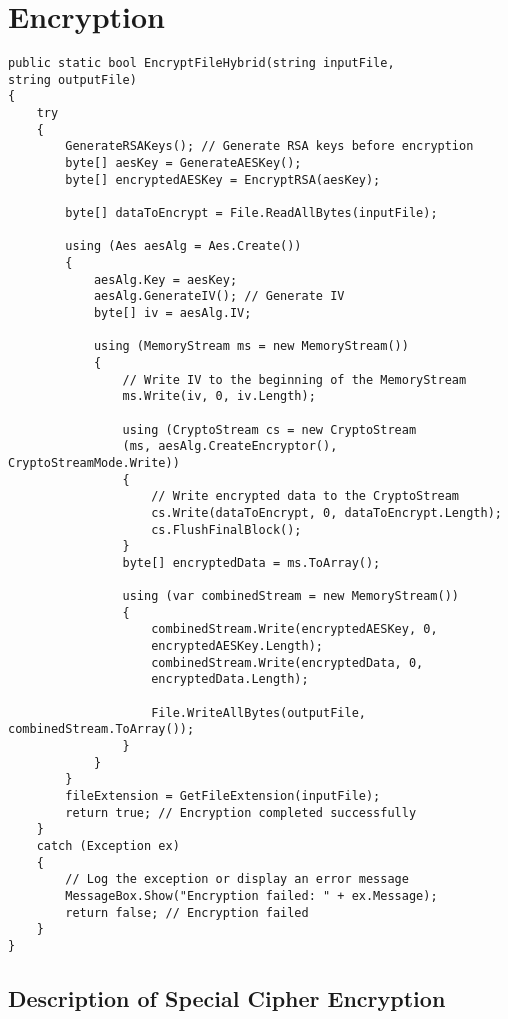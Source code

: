 \documentclass[a4paper,oneside,11pt]{book}
\begin{document}
\section{Encryption}
\begin{lstlisting}[language=Csh, caption={Code for Special Cipher Encryption}]
public static bool EncryptFileHybrid(string inputFile, 
string outputFile)
{
    try
    {
        GenerateRSAKeys(); // Generate RSA keys before encryption
        byte[] aesKey = GenerateAESKey();
        byte[] encryptedAESKey = EncryptRSA(aesKey);
    
        byte[] dataToEncrypt = File.ReadAllBytes(inputFile);
    
        using (Aes aesAlg = Aes.Create())
        {
            aesAlg.Key = aesKey;
            aesAlg.GenerateIV(); // Generate IV
            byte[] iv = aesAlg.IV;
    
            using (MemoryStream ms = new MemoryStream())
            {
                // Write IV to the beginning of the MemoryStream
                ms.Write(iv, 0, iv.Length);
    
                using (CryptoStream cs = new CryptoStream
                (ms, aesAlg.CreateEncryptor(), CryptoStreamMode.Write))
                {
                    // Write encrypted data to the CryptoStream
                    cs.Write(dataToEncrypt, 0, dataToEncrypt.Length);
                    cs.FlushFinalBlock();
                }
                byte[] encryptedData = ms.ToArray();
    
                using (var combinedStream = new MemoryStream())
                {
                    combinedStream.Write(encryptedAESKey, 0, 
                    encryptedAESKey.Length);
                    combinedStream.Write(encryptedData, 0, 
                    encryptedData.Length);
    
                    File.WriteAllBytes(outputFile, combinedStream.ToArray());
                }
            }
        }
        fileExtension = GetFileExtension(inputFile);
        return true; // Encryption completed successfully
    }
    catch (Exception ex)
    {
        // Log the exception or display an error message
        MessageBox.Show("Encryption failed: " + ex.Message);
        return false; // Encryption failed
    }
}
\end{lstlisting}

\subsection{Description of Special Cipher Encryption}
\end{document}
